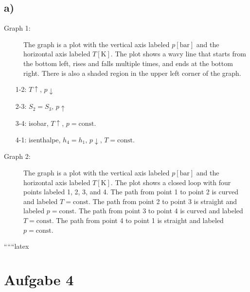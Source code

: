 

\subsection*{a)}

\begin{description}
    \item[Graph 1:] The graph is a plot with the vertical axis labeled \( p[\text{bar}] \) and the horizontal axis labeled \( T[\text{K}] \). The plot shows a wavy line that starts from the bottom left, rises and falls multiple times, and ends at the bottom right. There is also a shaded region in the upper left corner of the graph.
\end{description}

\begin{itemize}
    \item[1-2:] \( T \uparrow \), \( p \downarrow \)
    \item[2-3:] \( S_2 = S_3 \), \( p \uparrow \)
    \item[3-4:] isobar, \( T \uparrow \), \( p = \text{const.} \)
    \item[4-1:] isenthalpe, \( h_4 = h_1 \), \( p \downarrow \), \( T = \text{const.} \)
\end{itemize}

\begin{description}
    \item[Graph 2:] The graph is a plot with the vertical axis labeled \( p[\text{bar}] \) and the horizontal axis labeled \( T[\text{K}] \). The plot shows a closed loop with four points labeled 1, 2, 3, and 4. The path from point 1 to point 2 is curved and labeled \( T = \text{const} \). The path from point 2 to point 3 is straight and labeled \( p = \text{const} \). The path from point 3 to point 4 is curved and labeled \( T = \text{const} \). The path from point 4 to point 1 is straight and labeled \( p = \text{const} \).
\end{description}

``````latex

\section*{Aufgabe 4}